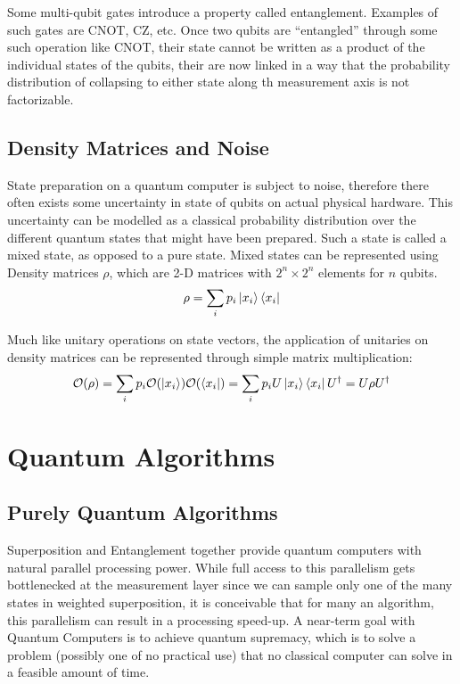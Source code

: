 Some multi-qubit gates introduce a property called entanglement. Examples of such gates are CNOT, CZ, etc. Once two qubits are ``entangled'' through some such operation like CNOT, their state cannot be written as a product of the individual states of the qubits, their are now linked in a way that the probability distribution of collapsing to either state along th measurement axis is not factorizable. 


\subsection{Density Matrices and Noise}

State preparation on a quantum computer is subject to noise, therefore there often exists some uncertainty in state of qubits on actual physical hardware. This uncertainty can be modelled as a classical probability distribution over the different quantum states that might have been prepared. Such a state is called a mixed state, as opposed to a pure state. Mixed states can be represented using Density matrices $\rho$, which are 2-D matrices with $2^n \times 2^n$ elements for $n$ qubits.
\begin{equation}
    \rho = \sum_{i} p_i \ket{x_i} \bra{x_i}
\end{equation}

Much like unitary operations on state vectors, the application of unitaries on density matrices can be represented through simple matrix multiplication:
\begin{equation}
    \mathcal{O} (\rho) = \sum_i p_i \mathcal{O}(\ket{x_i}) \mathcal{O}(\bra{x_i}) = \sum_i p_i U \ket{x_i} \bra{x_i} U^\dagger = U \rho U^\dagger
\end{equation}


\section{Quantum Algorithms}
\label{sec:quantum-algorithms}

\subsection{Purely Quantum Algorithms}

Superposition and Entanglement together provide quantum computers with natural parallel processing power. While full access to this parallelism gets bottlenecked at the measurement layer since we can sample only one of the many states in weighted superposition, it is conceivable that for many an algorithm, this parallelism can result in a processing speed-up. A near-term goal with Quantum Computers is to achieve quantum supremacy, which is to solve a problem (possibly one of no practical use) that no classical computer can solve in a feasible amount of time. \cite{quantum-complexity-survey}

